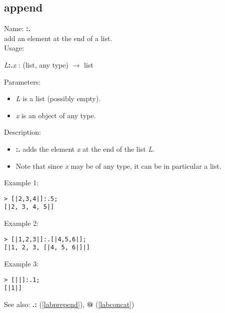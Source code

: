 \subsection{append}
\label{labappend}
\noindent Name: \textbf{:.}\\
add an element at the end of a list.\\

\noindent Usage: 
\begin{center}
\emph{L}\textbf{:.}\emph{x} : (\textsf{list}, \textsf{any type}) $\rightarrow$ \textsf{list}\\
\end{center}
Parameters: 
\begin{itemize}
\item \emph{L} is a list (possibly empty).
\item \emph{x} is an object of any type.
\end{itemize}
\noindent Description: \begin{itemize}

\item \textbf{:.} adds the element \emph{x} at the end of the list \emph{L}.

\item Note that since \emph{x} may be of any type, it can be in particular a list.
\end{itemize}
\noindent Example 1: 
\begin{center}\begin{minipage}{15cm}\begin{Verbatim}[frame=single]
> [|2,3,4|]:.5;
[|2, 3, 4, 5|]
\end{Verbatim}
\end{minipage}\end{center}
\noindent Example 2: 
\begin{center}\begin{minipage}{15cm}\begin{Verbatim}[frame=single]
> [|1,2,3|]:.[|4,5,6|];
[|1, 2, 3, [|4, 5, 6|]|]
\end{Verbatim}
\end{minipage}\end{center}
\noindent Example 3: 
\begin{center}\begin{minipage}{15cm}\begin{Verbatim}[frame=single]
> [||]:.1;
[|1|]
\end{Verbatim}
\end{minipage}\end{center}
See also: \textbf{.:} (\ref{labprepend}), \textbf{@} (\ref{labconcat})
